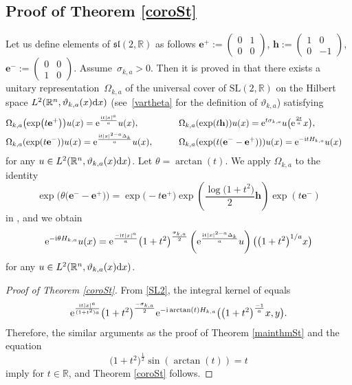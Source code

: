 \documentclass[pdftex]{sigma}
\numberwithin{equation}{section}
\def\R{\mathbb{R}}%
\def\SL{\mathrm{SL}}
\def\sl{\mathfrak{sl}}
\newcommand{\bfe}{\mathbf{e}}
\newcommand{\bfh}{\mathbf{h}}
\begin{document}
\subsection[Proof of Theorem 1.3]{Proof of Theorem \ref{coroSt}}
Let us define elements of $\sl(2,\R)$ as follows
$
\bfe^+:=\left(\begin{smallmatrix}0&1\\0&0\end{smallmatrix}\right)$, $
\bfh:=\left(\begin{smallmatrix}1&0\\0&-1\end{smallmatrix}\right)$, $
\bfe^-:=\left(\begin{smallmatrix}0&0\\1&0\end{smallmatrix}\right)$.
Assume~${\sigma_{k,a}>0}$.
Then it is proved in \cite[Theorem 3.30]{BKO} that there exists a unitary representation~$\Omega_{k,a}$ of the universal cover \smash{$\widetilde{\SL}(2,\R)$} of $\SL(2,\R)$ on the Hilbert space $L^2(\R^n,\vartheta_{k,a}(x){\rm d}x)$ (see~\eqref{vartheta} for the definition of $\vartheta_{k,a}$) satisfying
\begin{alignat*}{3}
& \Omega_{k,a}\bigl(\exp\bigl(t\bfe^+\bigr)\bigr)u(x)={\rm e}^{\frac{{\rm i}t|x|^a}{a}}u(x),\qquad&& \Omega_{k,a}(\exp(t\mathbf{h}))u(x)={\rm e}^{t\sigma_{k,a}}u\bigl({\rm e}^{\frac{2t}{a}}x\bigr),& \\
& \Omega_{k,a}(\exp(t\bfe^-))u(x)={\rm e}^{\frac{{\rm i}t|x|^{2-a}\Delta_k}{a}}u(x),\qquad&&\Omega_{k,a}(\exp(t(\bfe^--\bfe^+)))u(x)={\rm e}^{-{\rm i}tH_{k,a}}u(x)&
\end{alignat*}
for any $u\in L^2(\R^n,\vartheta_{k,a}(x){\rm d}x)$.
Let $\theta=\arctan(t)$. We apply $\Omega_{k,a}$ to the identity
\[
\exp\bigl(\theta\bigl(\bfe^--\bfe^+\bigr)\bigr)=\exp\bigl(-t\bfe^+\bigr)\exp\left(\frac{\log\bigl(1+t^2\bigr)}{2}\bfh\right)\exp(t\bfe^-)
\]
in \smash{$\widetilde{\SL}(2,\R)$}, and we obtain
\begin{align}\label{SL2}
{\rm e}^{-{\rm i}\theta H_{k,a}}u(x)
={\rm e}^{\frac{-{\rm i}t|x|^a}{a}}\bigl(1+t^2\bigr)^{\frac{\sigma_{k,a}}{2}}\left({\rm e}^{\frac{{\rm i}t|x|^{2-a}\Delta_k}{a}}u\right)\bigl(\bigl(1+t^2\bigr)^{1/a}x\bigr)
\end{align}
for any $u\in L^2(\R^n,\vartheta_{k,a}(x){\rm d}x)$.

\begin{proof}[Proof of Theorem \ref{coroSt}]
From \eqref{SL2}, the integral kernel  of  equals
\begin{align*}
{\rm e}^{\frac{{\rm i}t|x|^a}{(1+t^2)a}}\bigl(1+t^2\bigr)^{\frac{-\sigma_{k,a}}{2}}{\rm e}^{-{\rm i}\arctan(t)H_{k,a}}\bigl(\bigl(1+t^2\bigr)^{\frac{-1}{a}}x,y\bigr).
\end{align*}
Therefore, the similar arguments as the proof of Theorem \ref{mainthmSt} and the equation
\[
\bigl(1+t^2\bigr)^{\frac{1}{2}}\sin(\arctan(t))=t
\]
 imply
 for $t\in\R$, and Theorem \ref{coroSt} follows.
\end{proof}
\end{document}
